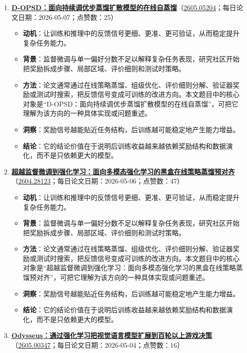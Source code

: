 \begin{enumerate}[leftmargin=1.5em]
\begin{itemize}[leftmargin=1.5em]
  \end{itemize}
  \item \textbf{\href{https://huggingface.co/papers/2605.05204}{D-OPSD：面向持续调优步蒸馏扩散模型的在线自蒸馏}}（\href{https://arxiv.org/abs/2605.05204}{2605.05204}；每日论文日期：2026-05-07；点赞数：25）
  \begin{itemize}[leftmargin=1.5em]
    \item \textbf{动机}：让训练和推理中的反馈信号更细、更准、更可验证，从而稳定提升复杂任务能力。
    \item \textbf{背景}：监督微调与单一偏好分数不足以解释复杂任务表现，研究社区开始把奖励拆成步骤、局部区域、评价细则和测试时策略。
    \item \textbf{方法}：论文通常通过在线策略蒸馏、组级优化、评价细则分解、验证器奖励或测试时搜索，把反馈信号变成可训练的改进方向。本文题目中的核心对象是“D-OPSD：面向持续调优步蒸馏扩散模型的在线自蒸馏”，可把它理解为该方向的一种具体实现或问题重述。
    \item \textbf{洞察}：奖励信号越能贴近任务结构，后训练越可能稳定地产生能力增益。
    \item \textbf{结论}：它的结论价值在于说明后训练收益越来越依赖奖励结构和数据演化，而不是只依赖更大的模型。
  \end{itemize}
  \item \textbf{\href{https://huggingface.co/papers/2604.28123}{超越监督微调到强化学习：面向多模态强化学习的黑盒在线策略蒸馏预对齐}}（\href{https://arxiv.org/abs/2604.28123}{2604.28123}；每日论文日期：2026-05-06；点赞数：47）
  \begin{itemize}[leftmargin=1.5em]
    \item \textbf{动机}：让训练和推理中的反馈信号更细、更准、更可验证，从而稳定提升复杂任务能力。
    \item \textbf{背景}：监督微调与单一偏好分数不足以解释复杂任务表现，研究社区开始把奖励拆成步骤、局部区域、评价细则和测试时策略。
    \item \textbf{方法}：论文通常通过在线策略蒸馏、组级优化、评价细则分解、验证器奖励或测试时搜索，把反馈信号变成可训练的改进方向。本文题目中的核心对象是“超越监督微调到强化学习：面向多模态强化学习的黑盒在线策略蒸馏预对齐”，可把它理解为该方向的一种具体实现或问题重述。
    \item \textbf{洞察}：奖励信号越能贴近任务结构，后训练越可能稳定地产生能力增益。
    \item \textbf{结论}：它的结论价值在于说明后训练收益越来越依赖奖励结构和数据演化，而不是只依赖更大的模型。
  \end{itemize}
  \item \textbf{\href{https://huggingface.co/papers/2605.00347}{Odysseus：通过强化学习把视觉语言模型扩展到百轮以上游戏决策}}（\href{https://arxiv.org/abs/2605.00347}{2605.00347}；每日论文日期：2026-05-04；点赞数：16）

\end{enumerate}

